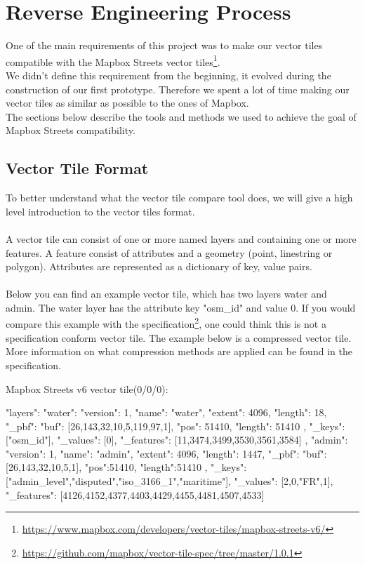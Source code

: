 \section{Reverse Engineering Process}\label{reverse_engineering_process}
One of the main requirements of this project was to make our vector tiles compatible with the Mapbox Streets vector tiles\footnote{\url{https://www.mapbox.com/developers/vector-tiles/mapbox-streets-v6/}}.
\\
We didn't define this requirement from the beginning, it evolved during the construction of our first prototype.
Therefore we spent a lot of time making our vector tiles as similar as possible to the ones of Mapbox.
\\
The sections below describe the tools and methods we used to achieve the goal of Mapbox Streets compatibility.

\subsection{Vector Tile Format}\label{vector_tile_format}
To better understand what the vector tile compare tool does, we will give a high level introduction to the vector tiles format.
\\\\
A vector tile can consist of one or more named layers and containing one or more features. A feature consist of attributes and a geometry (point, linestring or polygon). Attributes are represented as a dictionary of key, value pairs. 
\\\\
Below you can find an example vector tile, which has two layers water and admin. The water layer has the attribute key "osm\_id" and value 0. If you would compare this example with the specification\footnote{\url{https://github.com/mapbox/vector-tile-spec/tree/master/1.0.1}}, one could think this is not a specification conform vector tile. The example below is a compressed vector tile. More information on what compression methods are applied can be found in the specification.

Mapbox Streets v6 vector tile(0/0/0):
\begin{jsoncode}
{ 
  "layers": {
    "water": {
      "version": 1,
      "name": "water",
      "extent": 4096,
      "length": 18,
      "_pbf": {
        "buf": [26,143,32,10,5,119,97,1],
        "pos": 51410,
        "length": 51410
      },
      "_keys": ["osm_id"],
      "_values": [0],
      "_features": [11,3474,3499,3530,3561,3584] 
    },
    "admin": {
      "version": 1,
      "name": "admin",
      "extent": 4096,
      "length": 1447,
      "_pbf": {
        "buf": [26,143,32,10,5,1],
        "pos":51410,
        "length":51410
       },
      "_keys": ["admin_level","disputed","iso_3166_1","maritime"],
      "_values": [2,0,"FR",1],
      "_features": [4126,4152,4377,4403,4429,4455,4481,4507,4533]
    }
  } 
}
\end{jsoncode}

